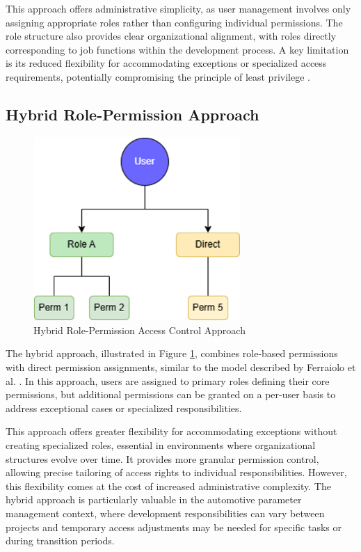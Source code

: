 This approach offers administrative simplicity, as user management involves only assigning appropriate roles rather than configuring individual permissions. The role structure also provides clear organizational alignment, with roles directly corresponding to job functions within the development process. A key limitation is its reduced flexibility for accommodating exceptions or specialized access requirements, potentially compromising the principle of least privilege \cite{sandhu1998role}.

\subsection{Hybrid Role-Permission Approach}
\label{subsec:hybrid-approach}

\begin{figure}[h]
    \centering
    \includegraphics[width=0.7\textwidth]{figures/hybrid_rbac_model.png}
    \caption{Hybrid Role-Permission Access Control Approach}
    \label{fig:hybrid-rbac}
\end{figure}

The hybrid approach, illustrated in Figure \ref{fig:hybrid-rbac}, combines role-based permissions with direct permission assignments, similar to the model described by Ferraiolo et al. \cite{ferraiolo2011policy}. In this approach, users are assigned to primary roles defining their core permissions, but additional permissions can be granted on a per-user basis to address exceptional cases or specialized responsibilities.

This approach offers greater flexibility for accommodating exceptions without creating specialized roles, essential in environments where organizational structures evolve over time. It provides more granular permission control, allowing precise tailoring of access rights to individual responsibilities. However, this flexibility comes at the cost of increased administrative complexity. The hybrid approach is particularly valuable in the automotive parameter management context, where development responsibilities can vary between projects and temporary access adjustments may be needed for specific tasks or during transition periods.

